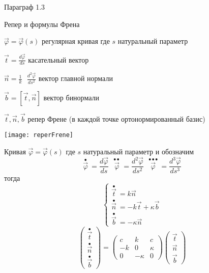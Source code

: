 \begin{title}[\Large]
  Параграф 1.3
\end{title}

\begin{title}[\Large]
  Репер и формулы Френа
\end{title}

\begin{define}
  $\vec \varphi = \vec \varphi (s)$ регулярная кривая где $s$ натуральный
  параметр

  $\vec t = \frac{d \vec \varphi}{ds}$ касательный вектор

  $\vec n = \frac{1}{k} ~~~ \frac{d^2 \vec \varphi}{ds^2}$ вектор главной
  нормали

  $\vec b = [\vec t, \vec n]$ вектор бинормали

  $\vec t, \vec n, \vec b$ репер Френе (в каждой точке ортонормированный базис)

  \texttt{[image: reperFrene]}
\end{define}

\begin{block}
  Кривая $\vec \varphi = \vec \varphi(s)$ где $s$ натуральный параметр и
  обозначим
  $$
  \stackrel{\bullet}{\vec \varphi} ~ = \frac{d \vec \varphi}{ds} ~~~
  \stackrel{\bullet \bullet}{\vec \varphi} ~ = \frac{d^2 \vec \varphi}{ds^2} ~~~
  \stackrel{\bullet \bullet \bullet}{\vec \varphi} ~ =
  \frac{d^3 \vec \varphi}{ds^3}
  $$
  тогда
  $$
  \left\{
  \begin{array}{l}
    \stackrel{\bullet}{\vec t} ~ = k \vec n \\
    \stackrel{\bullet}{\vec n} ~ = -k \vec t + \kappa \vec b \\
    \stackrel{\bullet}{\vec b} ~ = - \kappa \vec n
  \end{array}
  \right.
  $$
  $$
  \left(
  \begin{array}{c}
    \stackrel{\bullet}{\vec t} \\
    \stackrel{\bullet}{\vec n} \\
    \stackrel{\bullet}{\vec b}
  \end{array}
  \right) =
  \left(
  \begin{array}{ccc}
    c & k & c \\
    -k & 0 & \kappa \\
    0 & -\kappa & 0
  \end{array}
  \right)
  \left(
  \begin{array}{ccc}
    \vec t \\
    \vec n \\
    \vec b
  \end{array}
  \right)
  $$
\end{block}

